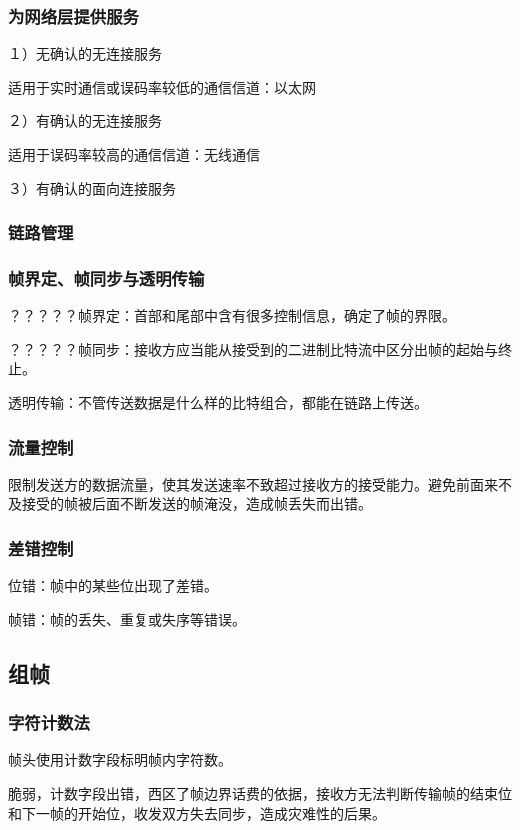\documentclass{ctexart}
\begin{document}
\subsubsection{为网络层提供服务}
１）无确认的无连接服务

适用于实时通信或误码率较低的通信信道：以太网

２）有确认的无连接服务

适用于误码率较高的通信信道：无线通信

３）有确认的面向连接服务


\subsubsection{链路管理}

\subsubsection{帧界定、帧同步与透明传输}

？？？？？帧界定：首部和尾部中含有很多控制信息，确定了帧的界限。

？？？？？帧同步：接收方应当能从接受到的二进制比特流中区分出帧的起始与终止。

透明传输：不管传送数据是什么样的比特组合，都能在链路上传送。

\subsubsection{流量控制}
限制发送方的数据流量，使其发送速率不致超过接收方的接受能力。避免前面来不及接受的帧被后面不断发送的帧淹没，造成帧丢失而出错。

\subsubsection{差错控制}


位错：帧中的某些位出现了差错。

帧错：帧的丢失、重复或失序等错误。

\subsection{组帧}
\subsubsection{字符计数法}

帧头使用计数字段标明帧内字符数。

脆弱，计数字段出错，西区了帧边界话费的依据，接收方无法判断传输帧的结束位和下一帧的开始位，收发双方失去同步，造成灾难性的后果。
\end{document}
